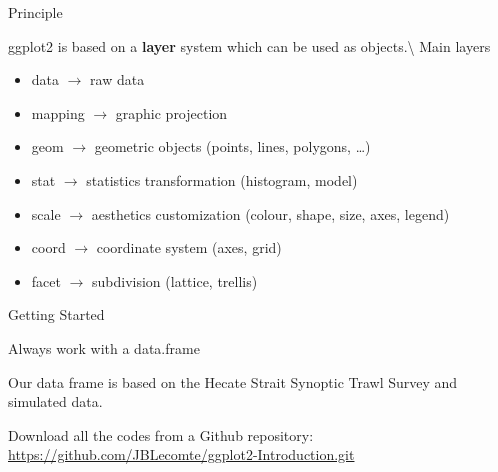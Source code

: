 \documentclass[
  ignorenonframetext,
]{beamer}
\providecommand{\tightlist}{%
  \setlength{\itemsep}{0pt}\setlength{\parskip}{0pt}}
\begin{document}
\begin{frame}{Principle}
\protect\hypertarget{principle}{}

ggplot2 is based on a \textbf{layer} system which can be used as
objects.\textbackslash{} Main layers

\begin{itemize}
\tightlist
\item
  data \(\rightarrow\) raw data
\item
  mapping \(\rightarrow\) graphic projection
\item
  geom \(\rightarrow\) geometric objects (points, lines, polygons,
  \ldots{})
\item
  stat \(\rightarrow\) statistics transformation (histogram, model)
\item
  scale \(\rightarrow\) aesthetics customization (colour, shape, size,
  axes, legend)
\item
  coord \(\rightarrow\) coordinate system (axes, grid)
\item
  facet \(\rightarrow\) subdivision (lattice, trellis)
\end{itemize}

\end{frame}

\begin{frame}{Getting Started}
\protect\hypertarget{getting-started}{}

Always work with a data.frame

Our data frame is based on the Hecate Strait Synoptic Trawl Survey and
simulated data.

Download all the codes from a Github repository:
\url{https://github.com/JBLecomte/ggplot2-Introduction.git}

\end{frame}
\end{document}
